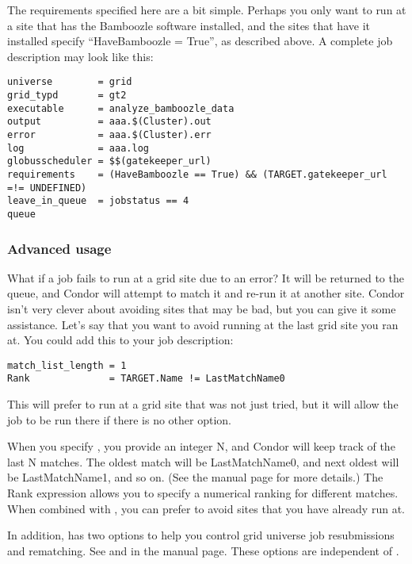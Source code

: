 The requirements specified here are a bit simple. Perhaps you only
want to run at a site that has the Bamboozle software installed, and
the sites that have it installed specify ``HaveBamboozle = True'', as
described above. A complete job description may look like this:

\footnotesize
\begin{verbatim}
universe        = grid
grid_typd       = gt2
executable      = analyze_bamboozle_data
output          = aaa.$(Cluster).out
error           = aaa.$(Cluster).err
log             = aaa.log
globusscheduler = $$(gatekeeper_url)
requirements    = (HaveBamboozle == True) && (TARGET.gatekeeper_url =!= UNDEFINED)
leave_in_queue  = jobstatus == 4
queue
\end{verbatim}
\normalsize

\subsubsection{Advanced usage}

What if a job fails to run at a grid site due to an error? It will be
returned to the queue, and Condor will attempt to match it and
re-run it at another site. Condor isn't very clever about avoiding
sites that may be bad, but you can give it some assistance. Let's say
that you want to avoid running at the last grid site you ran at. You
could add this to your job description:

\footnotesize
\begin{verbatim}
match_list_length = 1
Rank              = TARGET.Name != LastMatchName0
\end{verbatim}
\normalsize

This will prefer to run at a grid site that was not just tried, but it
will allow the job to be run there if there is no other option. 

When you specify , you provide an integer N, and
Condor will keep track of the last N matches. The oldest match will be
LastMatchName0, and next oldest will be LastMatchName1, and so on. (See
the  manual page for more details.) The Rank expression
allows you to specify a numerical ranking for different matches. When
combined with , you can prefer to avoid sites that
you have already run at. 

In addition,  has two options to help you control
grid universe job resubmissions and rematching.  See  and
 in the  manual page.
These options are independent of .

